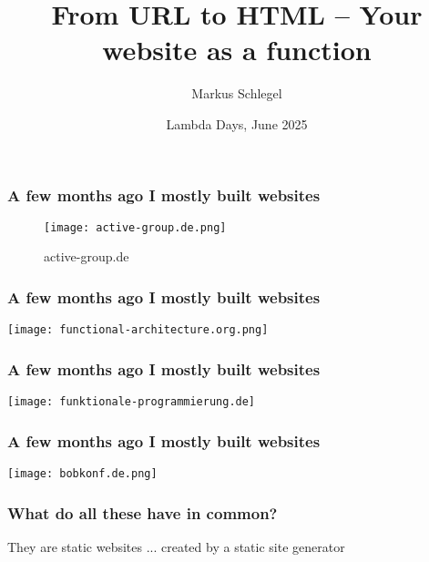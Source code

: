 \documentclass[aspectratio=169]{beamer}
\title{From URL to HTML -- Your website as a function}
\author{Markus Schlegel}
\institute{Active Group GmbH}
\date{Lambda Days, June 2025}
\begin{document}
\frame{\titlepage}

\begin{comment}
\begin{frame}
\begin{code}
module web where

import Data.List as L
open L using (List; _++_; []; _∷_; [_])
import Data.Maybe as Maybe
open Maybe using (Maybe; just; nothing; _<∣>_)
import Data.String as S
open S using (String; _==_)
import Data.Bool as B
open B using (Bool; if_then_else_)
open import Function.Base using (id; _∘_)
open import Relation.Binary.PropositionalEquality
  using (_≡_; cong; sym; trans; refl)
open import Data.Product hiding (map)
open import Data.Unit using (⊤; tt)
\end{code}
\end{frame}
\end{comment}

\begin{comment}
\begin{frame}
\begin{code}
private
  variable
    a b c d : Set
\end{code}
\end{frame}
\end{comment}

\begin{frame}
\frametitle{A few months ago I mostly built websites}
\begin{figure}
\centering
    \texttt{[image: active-group.de.png]}
    \caption{active-group.de}
\end{figure}
\end{frame}

\begin{frame}
\frametitle{A few months ago I mostly built websites}
\texttt{[image: functional-architecture.org.png]}
\end{frame}

\begin{frame}
\frametitle{A few months ago I mostly built websites}
\texttt{[image: funktionale-programmierung.de]}
\end{frame}

\begin{frame}
\frametitle{A few months ago I mostly built websites}
\texttt{[image: bobkonf.de.png]}
\end{frame}

\begin{frame}
\frametitle{What do all these have in common?}
They are static websites ... created by a static site generator
\end{frame}
\end{document}
